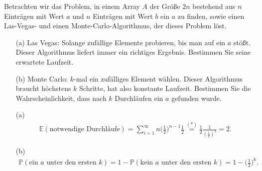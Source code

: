 
\begin{exercise}

\phantom{}

\end{exercise}

Betrachten wir das Problem, in einem Array $A$ der Größe $2n$ bestehend aus $n$ Einträgen mit Wert $a$ und $n$ Einträgen mit Wert $b$ ein $a$ zu finden, sowie einen Las-Vegas- und einen Monte-Carlo-Algorithmus, der dieses Problem löst.

\begin{itemize}
  \item[(a)] Las Vegas: Solange zufällige Elemente probieren, bis man auf ein $a$ stößt.
  Dieser Algorithmus liefert immer ein richtiges Ergebnis. Bestimmen Sie seine erwartete Laufzeit.
  \item[(b)] Monte Carlo: $k$-mal ein zufälliges Element wählen. Dieser Algorithmus braucht höchstens $k$ Schritte, hat also konstante Laufzeit. Bestimmen Sie die Wahrscheinlichkeit, dass nach $k$ Durchläufen ein $a$ gefunden wurde.
\end{itemize}

\begin{solution}

\phantom{}\begin{itemize}
    \item[(a)]
    \begin{align*}
        \mathbb E(\text{notwendige Durchläufe}) = \sum_{i = 1}^\infty n \biggr(\frac{1}{2}\biggl)^{n-1} \frac{1}{2} \stackrel{(\ast)}{=} \frac{1}{2} \frac{1}{(\frac{1}{2})^2} = 2.
    \end{align*}
    \item[(b)]
    \begin{align*}
        \mathbb P(\text{ein $a$ unter den ersten $k$}) = 1 - \mathbb P(\text{kein $a$ unter den ersten $k$}) = 1 - \biggl(\frac{1}{2}\biggr)^k.
    \end{align*}
\end{itemize}

\end{solution}
